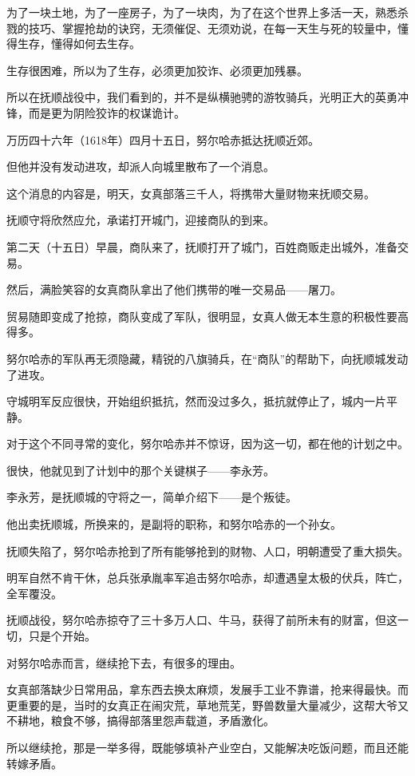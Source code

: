 \begin{multicols}{\theparacolNo}
为了一块土地，为了一座房子，为了一块肉，为了在这个世界上多活一天，熟悉杀戮的技巧、掌握抢劫的诀窍，无须催促、无须劝说，在每一天生与死的较量中，懂得生存，懂得如何去生存。

生存很困难，所以为了生存，必须更加狡诈、必须更加残暴。

所以在抚顺战役中，我们看到的，并不是纵横驰骋的游牧骑兵，光明正大的英勇冲锋，而是更为阴险狡诈的权谋诡计。

万历四十六年（1618年）四月十五日，努尔哈赤抵达抚顺近郊。

但他并没有发动进攻，却派人向城里散布了一个消息。

这个消息的内容是，明天，女真部落三千人，将携带大量财物来抚顺交易。

抚顺守将欣然应允，承诺打开城门，迎接商队的到来。

第二天（十五日）早晨，商队来了，抚顺打开了城门，百姓商贩走出城外，准备交易。

然后，满脸笑容的女真商队拿出了他们携带的唯一交易品——屠刀。

贸易随即变成了抢掠，商队变成了军队，很明显，女真人做无本生意的积极性要高得多。

努尔哈赤的军队再无须隐藏，精锐的八旗骑兵，在“商队”的帮助下，向抚顺城发动了进攻。

守城明军反应很快，开始组织抵抗，然而没过多久，抵抗就停止了，城内一片平静。

对于这个不同寻常的变化，努尔哈赤并不惊讶，因为这一切，都在他的计划之中。

很快，他就见到了计划中的那个关键棋子——李永芳。

李永芳，是抚顺城的守将之一，简单介绍下——是个叛徒。

他出卖抚顺城，所换来的，是副将的职称，和努尔哈赤的一个孙女。

抚顺失陷了，努尔哈赤抢到了所有能够抢到的财物、人口，明朝遭受了重大损失。

明军自然不肯干休，总兵张承胤率军追击努尔哈赤，却遭遇皇太极的伏兵，阵亡，全军覆没。

抚顺战役，努尔哈赤掠夺了三十多万人口、牛马，获得了前所未有的财富，但这一切，只是个开始。

对努尔哈赤而言，继续抢下去，有很多的理由。

女真部落缺少日常用品，拿东西去换太麻烦，发展手工业不靠谱，抢来得最快。而更重要的是，当时的女真正在闹灾荒，草地荒芜，野兽数量大量减少，这帮大爷又不耕地，粮食不够，搞得部落里怨声载道，矛盾激化。

所以继续抢，那是一举多得，既能够填补产业空白，又能解决吃饭问题，而且还能转嫁矛盾。


\end{multicols}
